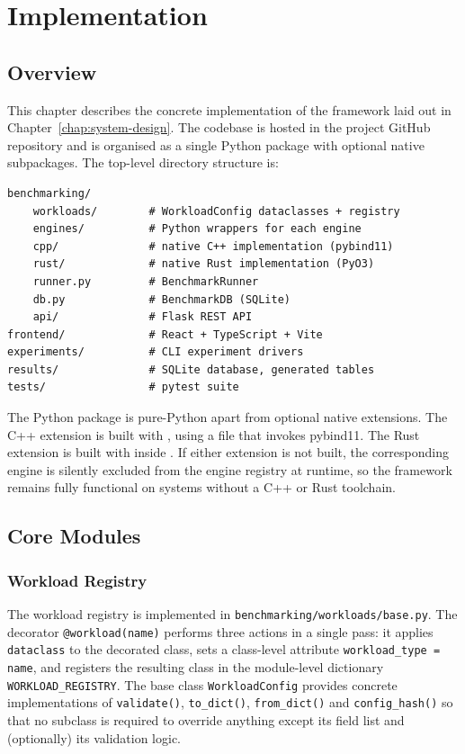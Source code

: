 \chapter{Implementation}
\label{chap:implementation}

\section{Overview}
\label{sec:impl-overview}

This chapter describes the concrete implementation of the framework laid out in
Chapter~\ref{chap:system-design}. The codebase is hosted in the project
GitHub repository and is organised as a single Python package with optional
native subpackages.
The top-level directory structure is:

\begin{verbatim}
benchmarking/
    workloads/        # WorkloadConfig dataclasses + registry
    engines/          # Python wrappers for each engine
    cpp/              # native C++ implementation (pybind11)
    rust/             # native Rust implementation (PyO3)
    runner.py         # BenchmarkRunner
    db.py             # BenchmarkDB (SQLite)
    api/              # Flask REST API
frontend/             # React + TypeScript + Vite
experiments/          # CLI experiment drivers
results/              # SQLite database, generated tables
tests/                # pytest suite
\end{verbatim}

The Python package is pure-Python apart from optional native extensions. The
C++ extension is built with , using a
 file that invokes pybind11. The Rust extension is built with
 inside . If either
extension is not built, the corresponding engine is silently excluded from the
engine registry at runtime, so the framework remains fully functional on
systems without a C++ or Rust toolchain.

\section{Core Modules}
\label{sec:core-modules}

\subsection{Workload Registry}
\label{sec:impl-registry}

The workload registry is implemented in \texttt{benchmarking/workloads/base.py}.
The decorator \texttt{@workload(name)} performs three actions in a single pass:
it applies \texttt{dataclass} to the decorated class, sets a class-level
attribute \texttt{workload\_type = name}, and registers the resulting class in
the module-level dictionary \texttt{WORKLOAD\_REGISTRY}. The base class
\texttt{WorkloadConfig} provides concrete implementations of \texttt{validate()},
\texttt{to\_dict()}, \texttt{from\_dict()} and \texttt{config\_hash()} so that no
subclass is required to override anything except its field list and (optionally)
its validation logic.

